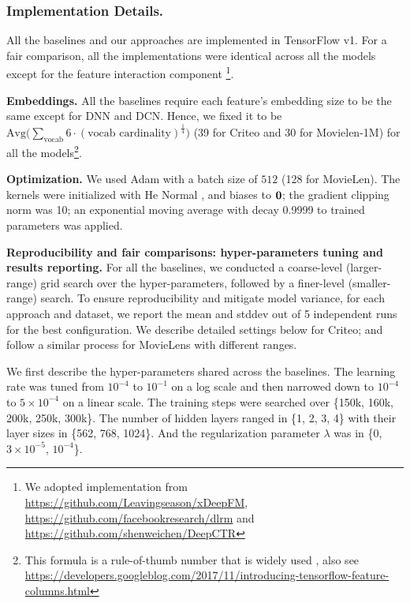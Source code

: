 \documentclass[sigconf]{acmart}
\newcommand{\veczero}{{\bf 0}}
\begin{document}
\subsubsection{Implementation Details.}
\label{sec:implementation_details}
All the baselines and our approaches are implemented in TensorFlow v1. For a fair comparison, all the implementations were identical across all the models except for the feature interaction component \footnote{We adopted implementation from \url{https://github.com/Leavingseason/xDeepFM}, \url{https://github.com/facebookresearch/dlrm} and \url{https://github.com/shenweichen/DeepCTR}}.

{\bf Embeddings.} All the baselines require each feature's embedding size to be the same except for DNN and DCN. Hence, we fixed it to be $ \text{Avg}\big(\sum_{\text{vocab}} 6\cdot(\text{vocab cardinality})^{\frac{1}{4}}\big)$ (39 for Criteo and 30 for Movielen-1M) for all the models\footnote{This formula is a rule-of-thumb number that is widely used \cite{wang2017deep}, also see \url{https://developers.googleblog.com/2017/11/introducing-tensorflow-feature-columns.html}}. 

{\bf Optimization.} We used Adam \cite{kingma2014adam} with a batch size of $512$ (128 for MovieLen). The kernels were initialized with He Normal \cite{he2015delving}, and biases to $\veczero$; the gradient clipping norm was 10; an exponential moving average with decay 0.9999 to trained parameters was applied.

{\bf Reproducibility and fair comparisons: hyper-parameters tuning and results reporting.} For all the baselines, we conducted a coarse-level (larger-range) grid search over the hyper-parameters, followed by a finer-level (smaller-range) search. To ensure reproducibility and mitigate model variance, for each approach and dataset, we report the mean and stddev out of 5 independent runs for the best configuration. We describe detailed settings below for Criteo; and follow a similar process for MovieLens with different ranges.

We first describe the hyper-parameters shared across the baselines. The learning rate was tuned from $10^{-4}$ to $10^{-1}$ on a log scale and then narrowed down to $10^{-4}$ to $5 \times 10^{-4}$ on a linear scale. The training steps were searched over \{150k, 160k, 200k, 250k, 300k\}. The number of hidden layers ranged in \{1, 2, 3, 4\} with their layer sizes in \{562, 768, 1024\}. And the regularization parameter $\lambda$ was in \{0, $3 \times 10^{-5}$, $10^{-4}$\}.
\end{document}
